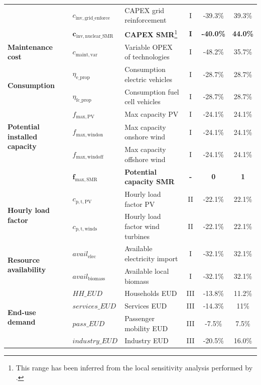 \documentclass[11pt,twoside,a4paper,english]{article}
\begin{document}
\begin{appendices}
\begin{table}[htbp!]
\begin{minipage}{\linewidth}
{\begin{tabular}{l l l c c c}
& $c_{\mathrm{inv,grid\_enforce}}$ & CAPEX grid reinforcement & I & -39.3\% & 39.3\% \\
& $\mathbf{c_{\mathrm{inv,nuclear\_SMR}}}$ & \textbf{CAPEX \gls{SMR}}\footnote{\label{foot:range_SMR_app}This range has been inferred from the local sensitivity analysis performed by \citet{PATHS2050}.} & \textbf{I} & \textbf{-40.0\%} & \textbf{44.0\%} \\
\midrule
\textbf{Maintenance cost} & $c_{\mathrm{maint,var}}$ & Variable OPEX of technologies & I & -48.2\% & 35.7\% \\
\midrule
\multirow{2}{*}{\textbf{Consumption}} &$\eta_{\mathrm{e\_prop}}$ & Consumption electric vehicles & I & -28.7\% & 28.7\% \\
& $\eta_{\mathrm{fc\_prop}}$ & Consumption fuel cell vehicles & I & -28.7\% & 28.7\% \\
\midrule
\multirow{3}{*}{\textbf{Potential installed capacity}} &$f_{\mathrm{max,PV}}$ & Max capacity PV & I & -24.1\% & 24.1\% \\
& $f_{\mathrm{max,windon}}$ & Max capacity onshore wind & I & -24.1\% & 24.1\% \\
& $f_{\mathrm{max,windoff}}$ & Max capacity offshore wind & I & -24.1\% & 24.1\% \\
& $\mathbf{f_{\mathrm{max,SMR}}}$ & \textbf{Potential capacity \gls{SMR}} & \textbf{-} & \textbf{0} & \textbf{1} \\
\midrule
\multirow{2}{*}{\textbf{Hourly load factor}} & $c_{\mathrm{p,t,PV}}$ & Hourly load factor PV & II & -22.1\% & 22.1\% \\
& $c_{\mathrm{p,t,winds}}$ & Hourly load factor wind turbines & II & -22.1\% & 22.1\% \\
\midrule
\multirow{2}{*}{\textbf{Resource availability}} & $avail_{\mathrm{elec}}$ & Available electricity import & I & -32.1\% & 32.1\% \\
& $avail_{\mathrm{biomass}}$ & Available local biomass & I & -32.1\% & 32.1\% \\
\midrule

\multirow{4}{*}{\textbf{End-use demand}} &$HH\_EUD$ & Households EUD & III & -13.8\% & 11.2\% \\
& $services\_EUD$ & Services EUD & III & -14.3\% & 11\% \\
& $pass\_EUD$ & Passenger mobility EUD & III & -7.5\% & 7.5\% \\
& $industry\_EUD$ & Industry EUD & III & -20.5\% & 16.0\% \\
\midrule


\end{tabular}}
\end{minipage}
\end{table}
\end{appendices}
\end{document}
